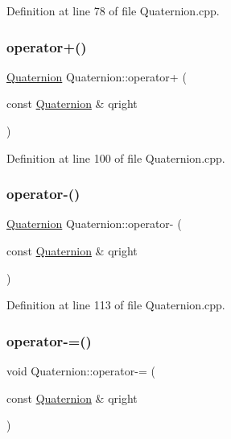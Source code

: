 Definition at line 78 of file Quaternion.\+cpp.

\mbox{\label{class_quaternion_ad1b6e783630601d29473d712cf8aa6ea}} 
\subsubsection{\texorpdfstring{operator+()}{operator+()}}
{\footnotesize\ttfamily \mbox{\hyperlink{class_quaternion}{Quaternion}} Quaternion\+::operator+ (\begin{DoxyParamCaption}\item[{const \mbox{\hyperlink{class_quaternion}{Quaternion}} \&}]{qright }\end{DoxyParamCaption})}



Definition at line 100 of file Quaternion.\+cpp.

\mbox{\label{class_quaternion_a18d7f575a9b46a21034fc3aae73c9c82}} 
\subsubsection{\texorpdfstring{operator-\/()}{operator-()}}
{\footnotesize\ttfamily \mbox{\hyperlink{class_quaternion}{Quaternion}} Quaternion\+::operator-\/ (\begin{DoxyParamCaption}\item[{const \mbox{\hyperlink{class_quaternion}{Quaternion}} \&}]{qright }\end{DoxyParamCaption})}



Definition at line 113 of file Quaternion.\+cpp.

\mbox{\label{class_quaternion_a207f0b200490590613f429d688fab593}} 
\subsubsection{\texorpdfstring{operator-\/=()}{operator-=()}}
{\footnotesize\ttfamily void Quaternion\+::operator-\/= (\begin{DoxyParamCaption}\item[{const \mbox{\hyperlink{class_quaternion}{Quaternion}} \&}]{qright }\end{DoxyParamCaption})}



